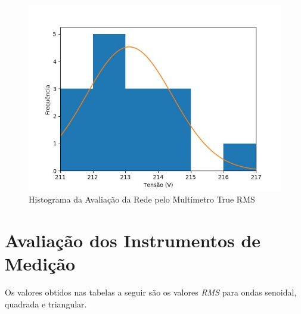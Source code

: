 \documentclass[14pt, oneside]{book}
\newcommand\tab[1][1cm]{\hspace*{#1}}
\theoremstyle{definition}
\begin{document}
                 \begin{figure}[H]
                    \centering
                    \includegraphics[scale= 0.5]{4.jpg}
                    \caption{Histograma da Avaliação da Rede pelo Multímetro True RMS}
                    \label{fig:my_labe10}
                \end{figure}

            \section{Avaliação dos Instrumentos de Medição}
			    \tab Os valores obtidos nas tabelas a seguir são os valores \textit{RMS} para ondas senoidal, quadrada e triangular.
            
\end{document}
